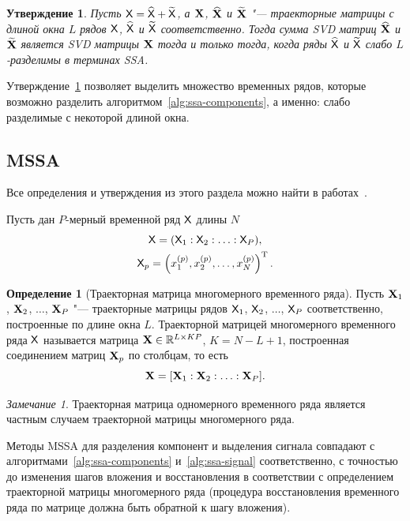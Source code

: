 \documentclass[specialist,
  substylefile=spbu.rtx,
subf,href,colorlinks=true, 12pt]{disser}
\theoremstyle{plain}
\newtheorem{statement}{Утверждение}[section]
\theoremstyle{definition}
\newtheorem{definition}{Определение}[section]
\theoremstyle{remark}
\newtheorem*{remark}{Замечание}
\begin{document}
\begin{statement}
  \label{state:ssa-separability}
  Пусть $\mathsf{X} = \widehat{\mathsf{X}} + \widetilde{\mathsf{X}}$, а $\mathbf{X}$, $\widehat{\mathbf{X}}$ и $\widetilde{\mathbf{X}}$ "--- траекторные
  матрицы с длиной окна $L$ рядов $\mathsf{X}$, $\widehat{\mathsf{X}}$ и $\widetilde{\mathsf{X}}$ соответственно.
  Тогда сумма \emph{SVD} матриц $\widehat{\mathbf{X}}$ и $\widetilde{\mathbf{X}}$ является \emph{SVD} матрицы $\mathbf{X}$ тогда и только тогда, когда
  ряды $\widehat{\mathsf{X}}$ и $\widetilde{\mathsf{X}}$ слабо $L$-разделимы в терминах \emph{SSA}.
\end{statement}

Утверждение~\ref{state:ssa-separability} позволяет выделить множество временных рядов, которые возможно
разделить алгоритмом~\ref{alg:ssa-components}, а именно: слабо разделимые с некоторой длиной окна.


\subsection{MSSA}\label{subsec:mssa}
Все определения и утверждения из этого раздела можно найти в работах~\cite{mssa, mssa2, ssa-2020}.

Пусть дан $P$-мерный временной ряд $\mathsf{X}$ длины $N$
\begin{gather*}
  \mathsf{X} = (\mathsf{X}_1: \mathsf{X}_2: \ldots: \mathsf{X}_P), \\
  \mathsf{X}_p = \left(x_1^{(p)}, x_2^{(p)}, \ldots, x_N^{(p)}\right)^{\mathrm{T}}.
\end{gather*}

\begin{definition}[Траекторная матрица многомерного временного ряда]
  Пусть \linebreak $\mathbf{X}_1$, $\mathbf{X}_2$, $\ldots$, $\mathbf{X}_P$ "--- траекторные матрицы рядов
  $\mathsf{X}_1$, $\mathsf{X}_2$, $\ldots$, $\mathsf{X}_P$ соответственно, построенные по длине окна $L$.
  Траекторной матрицей многомерного временного ряда $\mathsf{X}$ называется
  матрица $\mathbf{X}\in \mathbb{R}^{L \times KP}$, $K = N - L + 1$, построенная соединением матриц $\mathbf{X}_p$ по столбцам, то есть
  \[
    \mathbf{X} = [\mathbf{X}_1 : \mathbf{X}_2 : \ldots : \mathbf{X}_P].
  \]
\end{definition}

\begin{remark}
  Траекторная матрица одномерного временного ряда является частным случаем траекторной матрицы многомерного
  ряда.
\end{remark}

Методы MSSA для разделения компонент и выделения сигнала совпадают с алгоритмами~\ref{alg:ssa-components}
и~\ref{alg:ssa-signal} соответственно, с точностью до изменения шагов вложения и восстановления в соответствии
с определением траекторной матрицы многомерного ряда (процедура восстановления временного ряда по
матрице должна быть обратной к шагу вложения).
\end{document}
